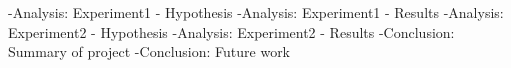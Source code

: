 -Analysis: Experiment1 - Hypothesis
-Analysis: Experiment1 - Results
-Analysis: Experiment2 - Hypothesis
-Analysis: Experiment2 - Results
-Conclusion: Summary of project
-Conclusion: Future work